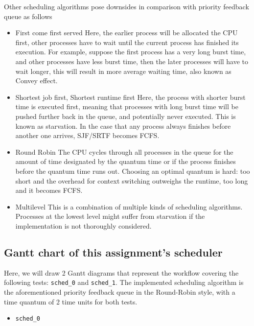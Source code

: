 \documentclass[a4paper]{article}
\numberwithin{equation}{section}
\begin{document}
Other scheduling algorithms pose downsides in comparison with priority feedback queue as follows
\begin{itemize}
  \item First come first served
        Here, the earlier process will be allocated the CPU first, other processes have to wait until the current process has finished its execution.
        For example, suppose the first process has a very long burst time, and other processes have less burst time, then the later processes will have to wait longer, this will result in more average waiting time, also known as Convey effect.

  \item Shortest job first, Shortest runtime first
        Here, the process with shorter burst time is executed first, meaning that processes with long burst time will be pushed further back in the queue, and potentially never executed.
        This is known as starvation.
        In the case that any process always finishes before another one arrives, SJF/SRTF becomes FCFS.\

  \item Round Robin
        The CPU cycles through all processes in the queue for the amount of time designated by the quantum time or if the process finishes before the quantum time runs out.
        Choosing an optimal quantum is hard: too short and the overhead for context switching outweighs the runtime, too long and it becomes FCFS.\

  \item Multilevel
        This is a combination of multiple kinds of scheduling algorithms.
        Processes at the lowest level might suffer from starvation if the implementation is not thoroughly considered.
\end{itemize}

\subsection{Gantt chart of this assignment's scheduler}
Here, we will draw 2 Gantt diagrams that represent the workflow covering the following tests: \texttt{sched_0} and \texttt{sched_1}.
The implemented scheduling algorithm is the aforementioned priority feedback queue in the Round-Robin style, with a time quantum of 2 time units for both tests.

\begin{itemize}
  \item \texttt{sched_0}
\end{itemize}
\end{document}

